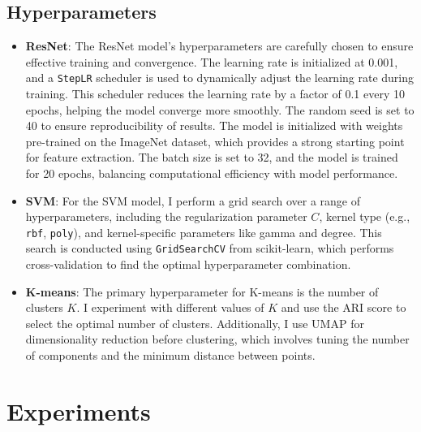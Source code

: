 \documentclass[12pt]{article}
\begin{document}
    \subsection{Hyperparameters}
    \begin{itemize}
        \item \textbf{ResNet}: The ResNet model's hyperparameters are carefully chosen to ensure effective training and convergence. The learning rate is initialized at 0.001, and a \texttt{StepLR} scheduler is used to dynamically adjust the learning rate during training. This scheduler reduces the learning rate by a factor of 0.1 every 10 epochs, helping the model converge more smoothly. The random seed is set to 40 to ensure reproducibility of results. The model is initialized with weights pre-trained on the ImageNet dataset, which provides a strong starting point for feature extraction. The batch size is set to 32, and the model is trained for 20 epochs, balancing computational efficiency with model performance.
    
        \item \textbf{SVM}: For the SVM model, I perform a grid search over a range of hyperparameters, including the regularization parameter \( C \), kernel type (e.g., \texttt{rbf}, \texttt{poly}), and kernel-specific parameters like gamma and degree. This search is conducted using \texttt{GridSearchCV} from scikit-learn, which performs cross-validation to find the optimal hyperparameter combination.
    
        \item \textbf{K-means}: The primary hyperparameter for K-means is the number of clusters \( K \). I experiment with different values of \( K \) and use the ARI score to select the optimal number of clusters. Additionally, I use UMAP for dimensionality reduction before clustering, which involves tuning the number of components and the minimum distance between points.
    \end{itemize}

\section{Experiments}
\end{document}
